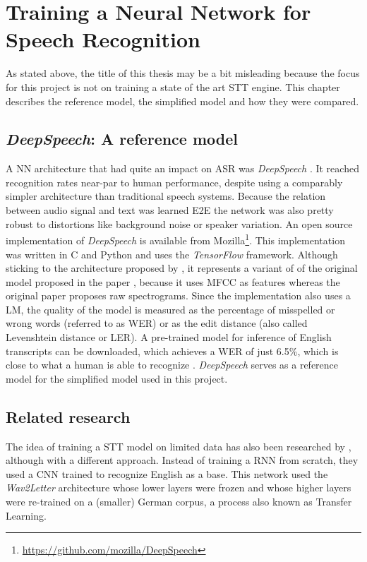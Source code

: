 \section{Training a Neural Network for Speech Recognition}\label{ds}
As stated above, the title of this thesis may be a bit misleading because the focus for this project is not on training a state of the art \ac{STT} engine. This chapter describes the reference model, the simplified model and how they were compared.

\subsection{\textit{DeepSpeech}: A reference model}

A \ac{NN} architecture that had quite an impact on \ac{ASR} was \textit{DeepSpeech} \parencite{deepspeech}. It reached recognition rates near-par to human performance, despite using a comparably simpler architecture than traditional speech systems. Because the relation between audio signal and text was learned \ac{E2E} the network was also pretty robust to distortions like background noise or speaker variation. An open source implementation of  \textit{DeepSpeech} is available from Mozilla\footnote{\url{https://github.com/mozilla/DeepSpeech}}. This implementation was written in C and Python and uses the \textit{TensorFlow} framework. Although sticking to the architecture proposed by \cite{deepspeech}, it represents a variant of of the original model proposed in the paper \parencite{ctc_paper}, because it uses \ac{MFCC} as features whereas the original paper proposes raw spectrograms. Since the implementation also uses a \ac{LM}, the quality of the model is measured as the percentage of misspelled or wrong words (referred to as \ac{WER}) or as the edit distance (also called Levenshtein distance or \ac{LER}). A pre-trained model for inference of English transcripts can be downloaded, which achieves a \ac{WER} of just 6.5\%, which is close to what a human is able to recognize \parencite{mozillajourney}. \textit{DeepSpeech} serves as a reference model for the simplified model used in this project.

\subsection{Related research}

The idea of training a \ac{STT} model on limited data has also been researched by \cite{budget}, although with a different approach. Instead of training a \ac{RNN} from scratch, they used a \ac{CNN} trained to recognize English as a base. This network used the \textit{Wav2Letter} \parencite{wav2letter} architecture whose lower layers were frozen and whose higher layers were re-trained on a (smaller) German corpus, a process also known as Transfer Learning. 

